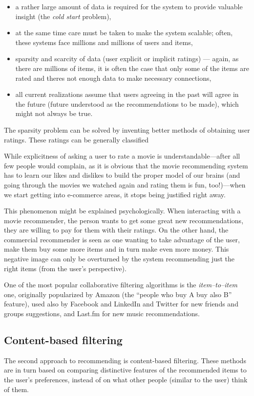 \begin{itemize}
	\item a rather large amount of data is required for the system to provide valuable insight (the \emph{cold start} problem),
	\item at the same time care must be taken to make the system scalable; often, these systems face millions and millions of users and items,
	\item sparsity and scarcity of data (user explicit or implicit ratings) --- again, as there are millions of items, it is often the case that only some of the items are rated and theres not enough data to make necessary connections,
	\item all current realizations assume that users agreeing in the past will agree in the future (future understood as the recommendations to be made), which might not always be true.
\end{itemize}

The sparsity problem can be solved by inventing better methods of obtaining user ratings. These ratings can be generally classified 

While explicitness of asking a user to rate a movie is understandable---after all few people would complain, as it is obvious that the movie recommending system has to learn our likes and dislikes to build the proper model of our brains (and going through the movies we watched again and rating them is fun, too!)---when we start getting into e-commerce areas, it stops being justified right away.

This phenomenon might be explained psychologically. When interacting with a movie recommender, the person wants to get some great new recommendations, they are willing to pay for them with their ratings. On the other hand, the commercial recommender is seen as one wanting to take advantage of the user, make them buy some more items and in turn make even more money. This negative image can only be overturned by the system recommending just the right items (from the user's perspective).

One of the most popular collaborative filtering algorithms is the \emph{item--to--item} one, originally popularized by Amazon (the ``people who buy A buy also B'' feature), used also by Facebook and LinkedIn and Twitter for new friends and groups suggestions, and Last.fm for new music recommendations.

\subsection{Content-based filtering}

The second approach to recommending is content-based filtering. These methods are in turn based on comparing distinctive features of the recommended items to the user's preferences, instead of on what other people (similar to the user) think of them.